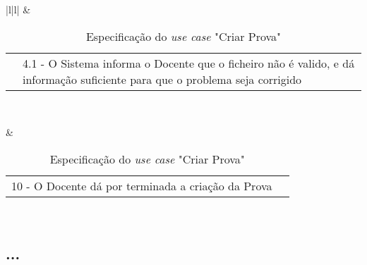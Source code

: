 \begin{table}[H]
\begin{center}
{\begin{tabular}{|l|l|}
                 & \begin{tabularx}{13cm}{X|X}
                    & 4.1 - O Sistema informa o Docente que o ficheiro não é valido, e dá informação suficiente para que o problema seja corrigido\\
                \end{tabularx} \\ \hline

                 & \begin{tabularx}{13cm}{X|X}
                    10 - O Docente dá por terminada a criação da Prova & \\
                \end{tabularx} \\ \hline
            \end{tabular}
        }
        \caption{Especificação do \textit{use case} "Criar Prova"}
    \end{center}
\end{table}

\subsection*{...}
